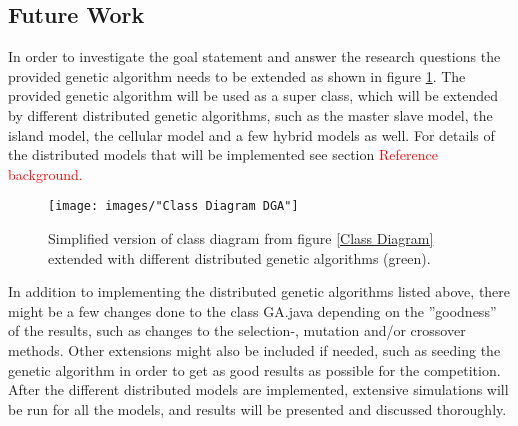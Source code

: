 \subsection{Future Work}


In order to investigate the goal statement and answer the research questions the provided genetic algorithm needs to be extended as shown in figure \ref{Class Diagram DGA}. The provided genetic algorithm will be used as a super class, which will be extended by different distributed genetic algorithms, such as the master slave model, the island model, the cellular model and a few hybrid models as well. For details of the distributed models that will be implemented see section \textcolor{red}{Reference background.}\\


\begin{figure}[h!]
\begin{center}
\texttt{[image: images/"Class Diagram DGA"]}
\caption{Simplified version of class diagram from figure \ref{Class Diagram} extended with different distributed genetic algorithms (green).}
\label{Class Diagram DGA}
\end{center}
\end{figure}


\noindent In addition to implementing the distributed genetic algorithms listed above, there might be a few changes done to the class GA.java depending on the ''goodness'' of the results, such as changes to the selection-, mutation and/or crossover methods. Other extensions might also be included if needed, such as seeding the genetic algorithm in order to get as good results as possible for the competition.\\

\noindent After the different distributed models are implemented, extensive simulations will be run for all the models, and results will be presented and discussed thoroughly. 

